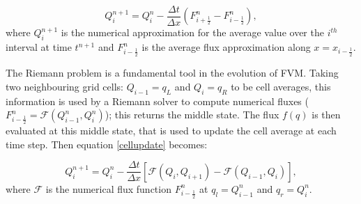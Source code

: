 \documentclass[9pt,a4paper]{article}
\begin{document}
	\begin{equation}
		Q_{i}^{n+1} = Q_{i}^{n} - \frac{\Delta t}{\Delta x} (F_{i+\frac{1}{2}}^{n} - F_{i-\frac{1}{2}}^{n}),
		\label{cellupdate}
	\end{equation}	
	where $Q_{i}^{n+1}$ is the numerical approximation for the average value over the $i^{th}$ interval at time $t^{n+1}$ and $F_{i-\frac{1}{2}}^{n} $ is the average flux approximation along $x=x_{i-\frac{1}{2}}$.
	
	The Riemann problem is a fundamental tool in the evolution of FVM. Taking two neighbouring grid cells: $Q_{i-1} = q_{L}$ and $Q_{i} = q_{R}$ to be cell averages, this information is used by a Riemann solver to compute numerical fluxes ( $F_{i-\frac{1}{2}}^{n} = \mathcal{F}(Q_{i-1}^{n} , Q_{i}^{n} )$); this returns the middle state.  The flux $f(q)$ is then evaluated at this middle state, that is used to update the cell average at each time step. Then equation \eqref{cellupdate} becomes:
	
	\begin{equation}
		Q_{i}^{n+1} = Q_{i}^{n} - \frac{\Delta t}{\Delta x} \left[ \mathcal{F}(Q_{i} , Q_{i+1} ) - \mathcal{F}(Q_{i-1} , Q_{i} ) \right],
		\label{cellupdat}
	\end{equation}
	where $\mathcal{F}$ is the  numerical flux function $F_{i-\frac{1}{2}}^{n}$ at $q_l = Q_{i-1}^{n}$  and $q_r = Q_{i}^{n}$.
	
\end{document}
